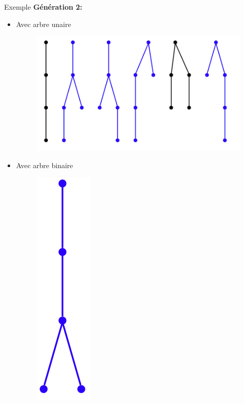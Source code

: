 \documentclass{beamer}
\begin{document}
\begin{frame}{Exemple}
\textbf{Génération 2:}\\
\begin{itemize}
\item  Avec arbre unaire
\begin{figure}[h]
  \centering
  \includegraphics[scale=0.17]{gen2-1.png}
\end{figure}
\item Avec arbre binaire
\begin{figure}[h]
  \centering
  \includegraphics[scale=0.17]{gen2-2.png}
\end{figure}
\end{itemize}
\end{frame}
\end{document}
